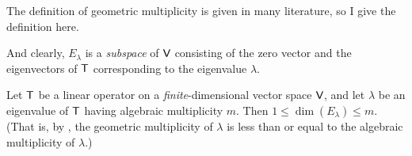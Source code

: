 \begin{note}
The definition of geometric multiplicity is given in many literature, so I give the definition here.

And clearly, \(E_{\lambda}\) is a \emph{subspace} of \(\textsf{V}\) consisting of the zero vector and the eigenvectors of \(\textsf{T}\) corresponding to the eigenvalue \(\lambda\).
\end{note}

\begin{theorem} \label{thm 5.7}
Let \(\textsf{T}\) be a linear operator on a \emph{finite}-dimensional vector space \(\textsf{V}\), and let \(\lambda\) be an eigenvalue of \(\textsf{T}\) having algebraic multiplicity \(m\).
Then \(1 \le \dim(E_{\lambda}) \le m\).
(That is, by , the geometric multiplicity of \(\lambda\) is less than or equal to the algebraic multiplicity of \(\lambda\).)
\end{theorem}

